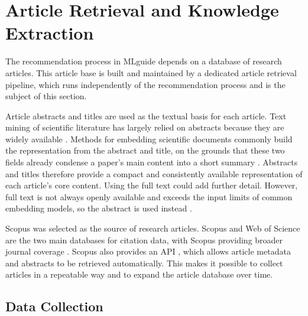 \section{Article Retrieval and Knowledge Extraction}
\label{sec:article-retrieval-and-knowledge-extraction}

The recommendation process in MLguide depends on a database of 
research articles. This article base is built and maintained 
by a dedicated article
retrieval pipeline, which runs independently of the recommendation
process and is the subject of this section.

Article abstracts and titles are used as the textual basis for each article.
Text mining of scientific literature has largely relied on abstracts
because they are widely available
\parencite{westergaard2018comprehensive_quantitative_comparison_text_mining_15_million_full_text_articles_versus_corresponding_abstracts}.
Methods for embedding scientific documents commonly build the
representation from the abstract and title, on the grounds that these
two fields already condense a paper's main content into a short summary
\parencite{cohan2020specterdocumentlevelrepresentationlearning}.
Abstracts and titles therefore provide a compact and consistently available
representation of each article's core content. Using the full text
could add further detail. However, full text is not always openly available
and exceeds the input limits of common embedding models, so the
abstract is used instead
\parencite{cohan2020specterdocumentlevelrepresentationlearning}.

Scopus was selected as the source of research articles. Scopus and 
Web of Science are the two main databases for citation data, with 
Scopus providing broader journal coverage 
\parencite{mongeon2016journal_coverage_web_science_scopus}. Scopus also 
provides an API \parencite{scopus_api}, which allows article 
metadata and abstracts to be retrieved automatically. 
This makes it possible to collect articles 
in a repeatable way and to expand the article database over time.


\subsection{Data Collection}
\label{sec:article-retrieval-data-collection}
 
